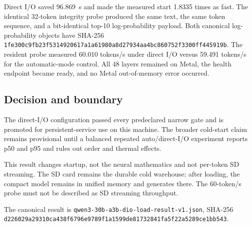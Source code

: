 Direct I/O saved 96.869~s and made the measured start 1.8335 times as fast.
The identical 32-token integrity probe produced the same text, the same token
sequence, and a bit-identical top-10 log-probability payload.  Both canonical
log-probability objects have SHA-256
\texttt{1fe300c9fb23f5314920617a1a61980a8d27934aa4bc860752f3300ff445919b}.
The resident probe measured 60.010 tokens/s under direct I/O versus 59.491
tokens/s for the automatic-mode control.  All 48 layers remained on Metal, the
health endpoint became ready, and no Metal out-of-memory error occurred.

\subsection{Decision and boundary}

The direct-I/O configuration passed every predeclared narrow gate and is
promoted for persistent-service use on this machine.  The broader cold-start
claim remains provisional until a balanced repeated auto/direct-I/O experiment
reports p50 and p95 and rules out order and thermal effects.

This result changes startup, not the neural mathematics and not per-token SD
streaming.  The SD card remains the durable cold warehouse; after loading, the
compact model remains in unified memory and generates there.  The 60-token/s
probe must not be described as SD streaming throughput.

The canonical result is
\texttt{qwen3-30b-a3b-dio-load-result-v1.json}, SHA-256
\texttt{d226029a29310ca438f6796e9789f1a1599de81732841fa5f22a5289ce1bb543}.

